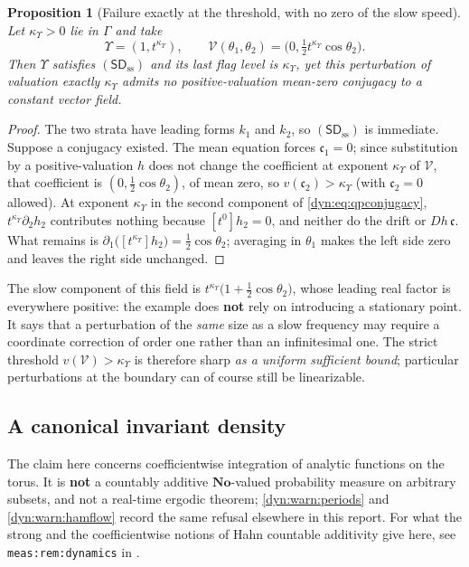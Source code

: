 \documentclass[11pt,letterpaper]{article}
\newtheorem{proposition}[proposition]{Proposition}
\theoremstyle{definition}
\theoremstyle{remark}
\newcommand{\No}{\mathbf{No}}
\newcommand{\sdss}{\mathsf{SD}_{\mathrm{ss}}}
\newcommand{\kups}{\kappa_{\Upsilon}}
\numberwithin{equation}{section}
\begin{document}
\begin{proposition}[Failure exactly at the threshold, with no zero of the
slow speed]\label{dyn:prop:qpboundary}
Let $\kups>0$ lie in $\Gamma$ and take
\[
 \Upsilon=(1,t^{\kups}),\qquad
 \mathcal V(\theta_1,\theta_2)=\bigl(0,\tfrac12t^{\kups}\cos\theta_2\bigr).
\]
Then $\Upsilon$ satisfies $(\sdss)$ and its last flag level is $\kups$, yet
this perturbation of valuation \emph{exactly} $\kups$ admits no
positive-valuation mean-zero conjugacy to a constant vector field.
\end{proposition}
\begin{proof}
The two strata have leading forms $k_1$ and $k_2$, so $(\sdss)$ is
immediate. Suppose a conjugacy existed. The mean equation forces
$\mathfrak c_1=0$; since substitution by a positive-valuation $h$ does not
change the coefficient at exponent $\kups$ of $\mathcal V$, that
coefficient is $(0,\tfrac12\cos\theta_2)$, of mean zero, so
$v(\mathfrak c_2)>\kups$ (with $\mathfrak c_2=0$ allowed). At exponent
$\kups$ in the second component of \eqref{dyn:eq:qpconjugacy},
$t^{\kups}\partial_2h_2$ contributes nothing because $[t^{0}]h_2=0$, and
neither do the drift or $Dh\,\mathfrak c$. What remains is
$\partial_1\bigl([t^{\kups}]h_2\bigr)=\tfrac12\cos\theta_2$; averaging in
$\theta_1$ makes the left side zero and leaves the right side unchanged.
\end{proof}

The slow component of this field is
$t^{\kups}\bigl(1+\tfrac12\cos\theta_2\bigr)$, whose leading real factor is
everywhere positive: the example does \textbf{not} rely on introducing a
stationary point. It says that a perturbation of the \emph{same} size as a
slow frequency may require a coordinate correction of order one rather than
an infinitesimal one. The strict threshold $v(\mathcal V)>\kups$ is
therefore sharp \emph{as a uniform sufficient bound}; particular
perturbations at the boundary can of course still be linearizable.

\subsection{A canonical invariant density}
\label{dyn:subsec:qpdensity}

The claim here concerns coefficientwise integration of analytic functions
on the torus. It is \textbf{not} a countably additive $\No$-valued
probability measure on arbitrary subsets, and not a real-time ergodic
theorem; \cref{dyn:warn:periods} and \cref{dyn:warn:hamflow} record the
same refusal elsewhere in this report. For what the strong and the
coefficientwise notions of Hahn countable additivity give here, see
\texttt{meas:rem:dynamics} in
.
\end{document}
